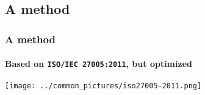 \subsection{A method}
\begin{frame}
  \frametitle{A method}
  \framesubtitle{Based on \texttt{ISO/IEC 27005:2011}, but optimized}
  \begin{center}
    \texttt{[image: ../common\_pictures/iso27005-2011.png]}
  \end{center}
\end{frame}
